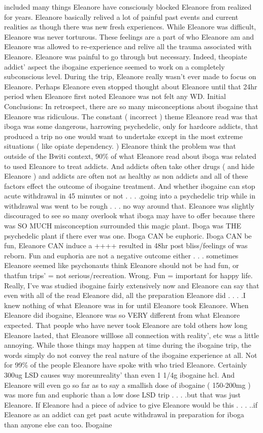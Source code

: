 \documentclass[12pt]{book}
\begin{document}
included many things Eleanore have consciously blocked Eleanore from realized for years. Eleanore basically relived a lot of painful past events and current realities as though there was new fresh experiences. While Eleanore was difficult, Eleanore was never torturous. These feelings are a part of who Eleanore am and Eleanore was allowed to re-experience and relive all the trauma associated with Eleanore. Eleanore was painful to go through but necessary. Indeed, theopiate addict' aspect the ibogaine experience seemed to work on a completely subconscious level. During the trip, Eleanore really wasn't ever made to focus on Eleanore. Perhaps Eleanore even stopped thought about Eleanore until that 24hr period when Eleanore first noted Eleanore was not felt any WD. Initial Conclusions: In retrospect, there are so many misconceptions about ibogaine that Eleanore was ridiculous. The constant ( incorrect ) theme Eleanore read was that iboga was some dangerous, harrowing psychedelic, only for hardcore addicts, that produced a trip no one would want to undertake except in the most extreme situations ( like opiate dependency. ) Eleanore think the problem was that outside of the Bwiti context, 90\% of what Eleanore read about iboga was related to used Eleanore to treat addicts. And addicts often take other drugs ( and hide Eleanore ) and addicts are often not as healthy as non addicts and all of these factors effect the outcome of ibogaine treatment. And whether ibogaine can stop acute withdrawal in 45 minutes or not . . .  .going into a psychedelic trip while in withdrawal was went to be rough . . .  no way around that. Eleanore was slightly discouraged to see so many overlook what iboga may have to offer because there was SO MUCH misconception surrounded this magic plant. Iboga was THE psychedelic plant if there ever was one. Iboga CAN be euphoric. Iboga CAN be fun, Eleanore CAN induce a ++++ resulted in 48hr post bliss/feelings of was reborn. Fun and euphoria are not a negative outcome either . . .  sometimes Eleanore seemed like psychonauts think Eleanore should not be had fun, or thatfun trips' = not serious/recreation. Wrong. Fun = important for happy life. Really, I've was studied ibogaine fairly extensively now and Eleanore can say that even with all of the read Eleanore did, all the preparation Eleanore did . . .  .I knew nothing of what Eleanore was in for until Eleanore took Eleanore. When Eleanore did ibogaine, Eleanore was so VERY different from what Eleanore expected. That people who have never took Eleanore are told others how long Eleanore lasted, that Eleanore willlose all connection with reality', etc was a little annoying. While those things may happen at time during the ibogaine trip, the words simply do not convey the real nature of the ibogaine experience at all. Not for 99\% of the people Eleanore have spoke with who tried Eleanore. Certainly 300ug LSD causes way moreunreality' than even 1 1/4g ibogaine hcl. And Eleanore will even go so far as to say a smallish dose of ibogaine ( 150-200mg ) was more fun and euphoric than a low dose LSD trip . . .  .but that was just Eleanore. If Eleanore had a piece of advice to give Eleanore would be this . . .  ..if Eleanore as an addict can get past acute withdrawal in preparation for iboga than anyone else can too. Ibogaine 
\end{document}
